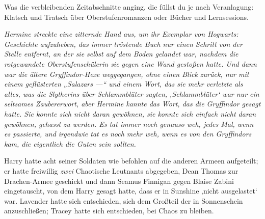 Was die verbleibenden Zeitabschnitte anging, die füllst du je nach Veranlagung: Klatsch und Tratsch über Oberstufenromanzen oder Bücher und Lernsessions.

\emph{Hermine streckte eine zitternde Hand aus, um ihr Exemplar von \emph{Hogwarts: Geschichte} aufzuheben, das immer tröstende Buch nur einen Schritt von der Stelle entfernt, an der sie selbst auf dem Boden gelandet war, nachdem die rotgewandete Oberstufenschülerin sie gegen eine Wand gestoßen hatte. Und dann war die ältere Gryffindor-Hexe weggegangen, ohne einen Blick zurück, nur mit einem geflüsterten
„Salazars —“ und einem Wort, das sie mehr verletzte als alles, was die Slytherins über Schlammblüter sagten, ‚Schlammblüter‘ war nur ein seltsames Zaubererwort, aber Hermine kannte das Wort, das die Gryffindor gesagt hatte. Sie konnte sich nicht daran gewöhnen, sie konnte sich einfach nicht daran gewöhnen, gehasst zu werden. Es tat immer noch genauso weh, jedes Mal, wenn es passierte, und irgendwie tat es noch mehr weh, wenn es von den Gryffindors kam, die \emph{eigentlich} die Guten sein sollten.}

Harry hatte acht seiner Soldaten wie befohlen auf die anderen Armeen aufgeteilt; er hatte freiwillig \emph{zwei} Chaotische Leutnants abgegeben, Dean Thomas zur Drachen-Armee geschickt und dann Seamus Finnigan gegen Blaise Zabini eingetauscht, von dem Harry gesagt hatte, dass er in Sunshine ‚nicht ausgelastet‘ war. Lavender hatte sich entschieden, sich dem Großteil der \SPHEW in Sonnenschein anzuschließen; Tracey hatte sich entschieden, bei Chaos zu bleiben.

